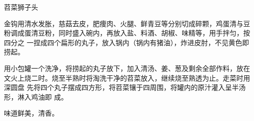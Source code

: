 \begin{recipe}{苕菜狮子头}

\ingredients


\preparation

\step 金钩用清水发胀，慈菇去皮，肥痩肉、火腿、鲜青豆等分别切成碎颗，鸡蛋清与豆
粉调成蛋清豆粉，同时盛入碗内，再放入盐、料酒、胡椒、味精等，用手拌匀，按四分之
一捏成四个扁形的丸子，放入锅内（锅内有猪油），炸进皮肘，不见黄色即捞起。

\step 用小包罐一个洗净，将捞起的丸子放下，加入清汤、姜、葱及剩余全部作料，放在
文火上烧二时。烧至半熟时将淘洗干净的苕菜放入，继续烧至熟透为止。走菜时用深圆盘
先将四个丸子摆成四方形，将苕菜镶于四周围，将罐内的原汁灌入呈半汤形，淋入鸡油即
成。

\features

味道鲜美，清香。

\end{recipe}

